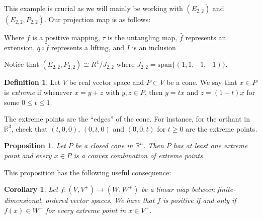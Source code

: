 \documentclass[11pt]{amsart}
\newtheorem{prop}[thm]{Proposition}
\newtheorem{cor}[thm]{Corollary}
\theoremstyle{definition}
\newtheorem{defn}[thm]{Definition}
\def\bb{\mathbb}
\begin{document}
This example is crucial as we will mainly be working with \((E_{2,2})\) and \((E_{2,2}, P_{2,2})\). Our projection map is as follows:

\begin{center}
\end{center}

\begin{center}
    Where \(f\) is a positive mapping, \(\tau\) is the untangling map, \( \hat{f} \) represents an extension, \( q \circ \tilde{f} \) represents a lifting, and \(I\) is an inclusion
\end{center}
Notice that $(E_{2,2}, P_{2,2}) \cong R^4/J_{2,2}$ where $J_{2,2} = \text{span}\{ (1, 1, -1, -1) \}$.

\begin{defn}
    Let $V$ be real vector space and $P\subset V$ be a cone. We say that $x\in P$ is \emph{extreme} if whenever $x = y+z$ with $y,z\in P$, then $y = tx$ and $z = (1-t)x$ for some $0\leq t\leq 1$. 
\end{defn}
The extreme points are the ``edges'' of the cone. For instance, for the orthant in $\bb R^3$, check that $(t,0,0)$, $(0,t,0)$ and $(0,0,t)$ for $t\geq 0$ are the extreme points.

\begin{prop}
    Let $P$ be a closed cone in $\bb R^n$. Then $P$ has at least one extreme point and every $x\in P$ is a convex combination of extreme points. 
\end{prop}

This proposition has the following useful consequence:

\begin{cor}\label{cor:extreme-pos}
    Let $f: (V,V^+)\to (W,W^+)$ be a linear map between finite-dimensional, ordered vector spaces. We have that $f$ is positive if and only if $f(x)\in W^+$ for every extreme point in $x\in V^+$. 
\end{cor}
\end{document}
